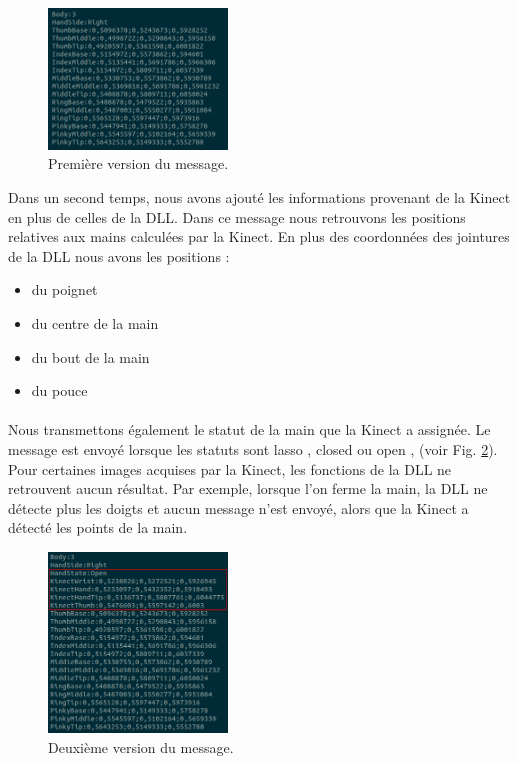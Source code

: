\begin{figure}[H]
  \label{fig:socketv1}
  \begin{center}
    \includegraphics[width=180px]{images/socket_v1.png}
    \caption{Première version du message.}
  \end{center}
\end{figure}

Dans un second temps, nous avons ajouté les informations provenant de la 
Kinect en plus de celles de la DLL. Dans ce message nous retrouvons 
les positions relatives aux mains calculées par la Kinect. En plus des 
coordonnées des jointures de la DLL nous avons les positions :\\
\begin{itemize}
  \item du poignet
  \item du centre de la main
  \item du bout de la main
  \item du pouce
\end{itemize}
\paragraph{}
Nous transmettons également le statut de la main que la Kinect a 
assignée. Le message est envoyé lorsque les statuts sont \og lasso \fg, \og closed \fg ou 
\og open \fg, (voir Fig. \ref{fig:socketv2}). Pour certaines images 
acquises par la Kinect, les fonctions de la DLL ne retrouvent aucun 
résultat. Par exemple, lorsque l'on ferme la main, la DLL ne détecte 
plus les doigts et aucun message n'est envoyé, alors que la Kinect a 
détecté les points de la main.

\begin{figure}[H]
  \label{fig:socketv2}
  \begin{center}
    \includegraphics[width=180px]{images/socket_v2.png}
    \caption{Deuxième version du message.}
  \end{center}
\end{figure}

